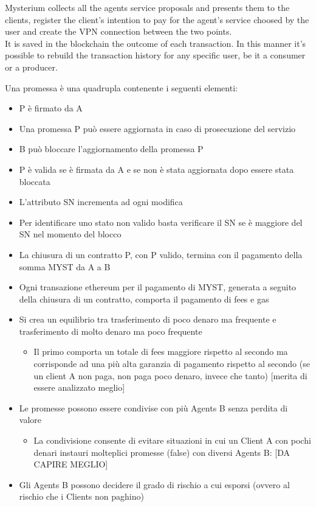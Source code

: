 \documentclass[]{article}
\begin{document}
	Mysterium collects all the agents service proposals and presents them to the clients, register the client's intention to pay for the agent's service choosed by the user and create the VPN connection between the two points.\\
	It is saved in the blockchain the outcome of each transaction. In this manner it's possible to rebuild the transaction history for any specific user, be it a consumer or a producer.
	
	Una promessa è una quadrupla contenente i seguenti elementi:
	
	\begin{itemize}
		\item P è firmato da A
		\item Una promessa P può essere aggiornata in caso di prosecuzione del servizio
		\item B può bloccare l’aggiornamento della promessa P
		\item P è valida se è firmata da A e se non è stata aggiornata dopo essere stata bloccata
		\item L’attributo SN incrementa ad ogni modifica
		\item Per identificare uno stato non valido basta verificare il SN se è maggiore del SN nel momento del blocco
		\item La chiusura di un contratto P, con P valido, termina con il pagamento della somma MYST da A a B
		\item Ogni transazione ethereum per il pagamento di MYST, generata a seguito della chiusura di un contratto, comporta il pagamento di fees e gas
		\item Si crea un equilibrio tra trasferimento di poco denaro ma frequente e trasferimento di molto denaro ma poco frequente
		\begin{itemize}
			\item Il primo comporta un totale di fees maggiore rispetto al secondo ma corrisponde ad una più alta garanzia di pagamento rispetto al secondo (se un client A non paga, non paga poco denaro, invece che tanto) [merita di essere analizzato meglio]
		\end{itemize}
		\item Le promesse possono essere condivise con più Agents B senza perdita di valore
		\begin{itemize}
			\item La condivisione consente di evitare situazioni in cui un Client A con pochi denari instauri molteplici promesse (false) con diversi Agents B: [DA CAPIRE MEGLIO]
		\end{itemize}
		\item Gli Agents B possono decidere il grado di rischio a cui esporsi (ovvero al rischio che i Clients non paghino)
	\end{itemize}
	
\end{document}
